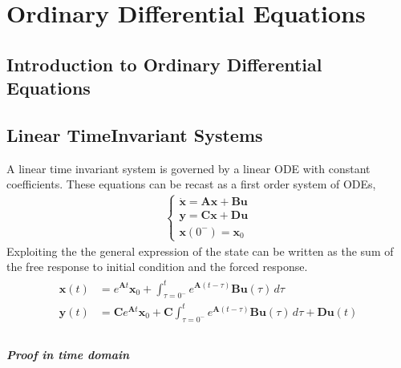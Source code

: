 \documentclass[letterpaper,10pt,english]{jupyterBook}
\begin{document}
\sphinxstepscope


\part{Ordinary Differential Equations}

\sphinxstepscope


\chapter{Introduction to Ordinary Differential Equations}
\label{\detokenize{ch/ode/intro:introduction-to-ordinary-differential-equations}}\label{\detokenize{ch/ode/intro:ode}}\label{\detokenize{ch/ode/intro::doc}}
\sphinxstepscope


\chapter{Linear Time\sphinxhyphen{}Invariant Systems}
\label{\detokenize{ch/ode/lti:linear-time-invariant-systems}}\label{\detokenize{ch/ode/lti:ode-lti}}\label{\detokenize{ch/ode/lti::doc}}
\sphinxAtStartPar
A linear time invariant system is governed by a linear ODE with constant coefficients. These equations can be recast as a first order system of ODEs,
\begin{equation*}
\begin{split}\begin{cases}
  \dot{\mathbf{x}} = \mathbf{A} \mathbf{x} + \mathbf{B} \mathbf{u} \\
       \mathbf{y}  = \mathbf{C} \mathbf{x} + \mathbf{D} \mathbf{u} \\
  \mathbf{x}(0^-) = \mathbf{x}_0
\end{cases}\end{split}
\end{equation*}
\sphinxAtStartPar
Exploiting the {\hyperref[\detokenize{ch/ode/lti:ode-lti-matrix-properties}]{}} the general expression of the state can be written as the sum of the free response to initial condition and the forced response.
\begin{equation*}
\begin{split}\begin{aligned}
  \mathbf{x}(t) & = e^{\mathbf{A}t} \mathbf{x}_0 + \int_{\tau=0^-}^{t} e^{\mathbf{A}(t-\tau)} \mathbf{B} \mathbf{u} (\tau) \, d \tau \\
  \mathbf{y}(t) & = \mathbf{C} e^{\mathbf{A}t} \mathbf{x}_0 + \mathbf{C} \int_{\tau=0^-}^{t} e^{\mathbf{A}(t-\tau)} \mathbf{B} \mathbf{u} (\tau) \, d \tau  + \mathbf{D} \mathbf{u}(t) \\
\end{aligned}\end{split}
\end{equation*}\subsubsection*{Proof in time domain}
\end{document}
